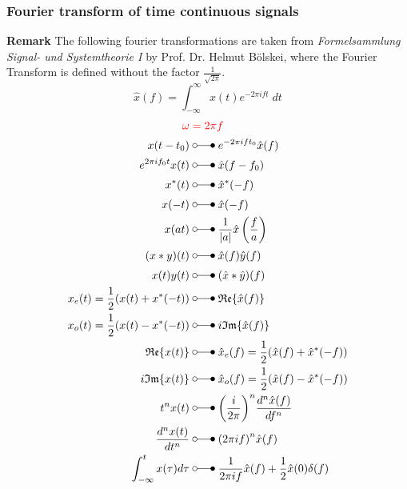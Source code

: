 \subsubsection{Fourier transform of time continuous signals}
{\footnotesize \textbf{Remark} The following fourier transformations are taken from \textit{Formelsammlung Signal- und Systemtheorie I} by Prof. Dr. Helmut Bölskei,
    where the Fourier Transform is defined without the factor $\frac{1}{\sqrt{2\pi}}$.}
\begin{equation*}
    \widehat{x}(f) =\int_{-\infty}^{\infty} x(t) e^{-2\pi ift}\; dt
\end{equation*}
\begin{align*}
    {\color{red} \omega}\;                   & {\color{red} =2\pi f}                                                    \\
    x(t-t_{0})  \;                           & \laplace\;    e^{-2\pi ift_{0}}\hat{x}(f)                                \\
    e^{2\pi if_0t}x(t)  \;                   & \laplace\;    \hat{x}(f-f_0)                                             \\
    x^{*}(t)  \;                             & \laplace\;    \hat{x}^{*}(-f)                                            \\
    x(-t)  \;                                & \laplace\;    \hat{x}(-f)                                                \\
    x(at)  \;                                & \laplace\;    \frac{1}{|a|}\hat{x}\left(\frac fa\right)                  \\
    (x*y)(t)  \;                             & \laplace\;    \hat{x}(f)\hat{y}(f)                                       \\
    x(t)y(t) \;                              & \laplace\;    (\hat{x}*\hat{y})(f)                                       \\
    x_{e}(t)=\frac{1}{2}(x(t)+x^{*}(-t))  \; & \laplace\;    \mathfrak{Re}\{\hat{x}(f)\}                                \\
    x_o(t)=\frac{1}{2}(x(t)-x^*(-t)) \;      & \laplace\;    i\mathfrak{Im}\{\hat{x}(f)\}                               \\
    \mathfrak{Re}\{x(t)\}  \;                & \laplace\;    \hat{x}_{e}(f) =\frac{1}{2}(\hat{x}(f)+\hat{x}^{*}(-f))    \\
    i\mathfrak{Im}\{x(t)\}  \;               & \laplace\;    \hat{x}_{o}(f) =\frac12(\hat{x}(f)-\hat{x}^*(-f))          \\
    t^{n}x(t)  \;                            & \laplace\;    {\left(\frac i{2\pi}\right)}^n\frac{d^n\hat{x}(f)}{df^n}   \\
    \frac{d^n x(t)}{dt^n}  \;                & \laplace\;    {(2\pi if)}^n\hat{x}(f)                                    \\
    \int_{-\infty}^t x(\tau)d\tau \;         & \laplace\;    \frac{1}{2\pi if}\hat{x}(f)+\frac{1}{2}\hat{x}(0)\delta(f) \\
\end{align*}

